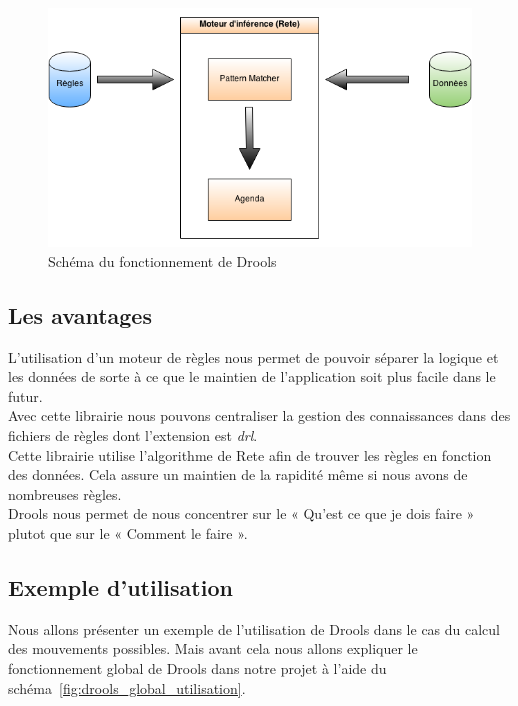 		
			\begin{figure}[!h]
			    \caption{Schéma du fonctionnement de Drools}
			    \centering
			    \includegraphics[width=\textwidth]{images/architecture/drools_schema.png}
			\end{figure}


		\subsection{Les avantages}
			L'utilisation d'un moteur de règles nous permet de pouvoir séparer la logique et les données de sorte à ce que le maintien de l'application soit plus facile dans le futur.
			\\
			Avec cette librairie nous pouvons centraliser la gestion des connaissances dans des fichiers de règles dont l'extension est {\itshape drl}.
			\\
			Cette librairie utilise l'algorithme de Rete afin de trouver les règles en fonction des données. Cela assure un maintien de la rapidité même si nous avons de nombreuses règles.
			\\
			Drools nous permet de nous concentrer sur le « Qu'est ce que je dois faire » plutot que sur le « Comment le faire ».


		\pagebreak
		\subsection{Exemple d'utilisation}

			Nous allons présenter un exemple de l'utilisation de Drools dans le cas du calcul des mouvements possibles. Mais avant cela nous allons expliquer le fonctionnement global de Drools dans notre projet à l'aide du schéma~\ref{fig:drools_global_utilisation}.

